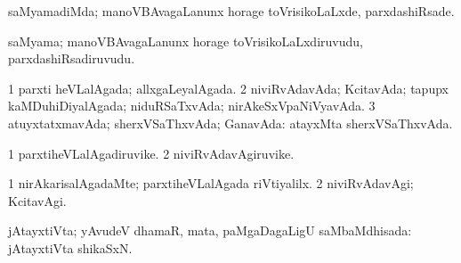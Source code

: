 {\bentry
{} 
\gl{\kirxvi}
\expl{}
\bmng
 saMyamadiMda; manoVBAvagaLanunx horage toVrisikoLaLxde, parxdashiRsade. 
\emng
\eentry

\bentry
{} 
\gl{\nA}
\expl{}
\bmng
 saMyama; manoVBAvagaLanunx horage toVrisikoLaLxdiruvudu, parxdashiRsadiruvudu. 
\emng
\eentry

\bentry
{} 
\gl{\gu}
\expl{}
\bmng
\bnum
\num{1} parxti heVLalAgada; allxgaLeyalAgada. 
\num{2} niviRvAdavAda; KcitavAda; tapupx kaMDuhiDiyalAgada; niduRSaTxvAda; nirAkeSxVpaNiVyavAda. 
\num{3} atuyxtatxmavAda; sherxVSaThxvAda; GanavAda:  atayxMta sherxVSaThxvAda. 
\enum
\emng
\eentry

\bentry
{} 
\gl{\nA}
\expl{}
\bmng
\bnum
\num{1} parxtiheVLalAgadiruvike. 
\num{2} niviRvAdavAgiruvike. 
\enum
\emng
\eentry

\bentry
{} 
\gl{\kirxvi}
\expl{}
\bmng
\bnum
\num{1} nirAkarisalAgadaMte; parxtiheVLalAgada riVtiyalilx. 
\num{2} niviRvAdavAgi; KcitavAgi. 
\enum
\emng
\eentry

\bentry
{} 
\gl{\gu}
\expl{}
\bmng
 jAtayxtiVta; yAvudeV dhamaR, mata, paMgaDagaLigU saMbaMdhisada:  jAtayxtiVta shikaSxN. 
\emng
\eentry

}
